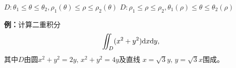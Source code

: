 \begin{center}
	\hspace{2cm}
	
	$D:\theta_1\leq\theta\leq\theta_2,\rho_1(\theta)\leq\rho\leq\rho_2(\theta)$
	\hspace{2cm}
	$D:\rho_1\leq\rho\leq\rho_2,\theta_1(\rho)\leq\theta\leq\theta_2(\rho)$
\end{center}

{\bf 例：}计算二重积分
$$\iint_D(x^2+y^2)\mathrm{d} x\mathrm{d} y,$$
其中$D$由圆$x^2+y^2=2y,\,x^2+y^2=4y$及直线
$x=\sqrt 3y,\,y=\sqrt 3x$围成。

